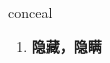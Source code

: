 
\begin{frame}
{\huge conceal}
\begin{center}
\begin{enumerate}\Large
  \item \textbf{隐藏，隐瞒}
\end{enumerate}
\end{center}
\end{frame}
